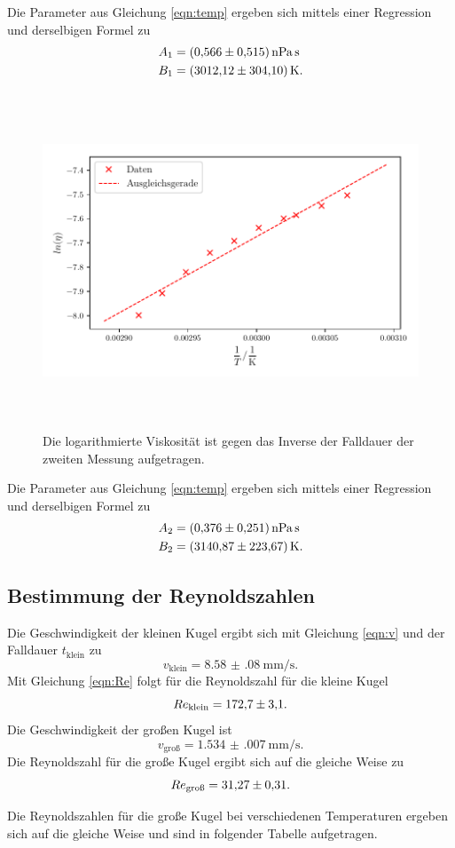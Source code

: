 \noindent Die Parameter aus Gleichung \eqref{eqn:temp} ergeben sich mittels einer Regression und derselbigen Formel zu
\begin{align*} 
    A_1 &= \SI{0.566(515)}{\nano\pascal\second} \\
    B_1 &= \SI{3012.12 \pm 304.10}{\kelvin}. \\
\end{align*}


\begin{figure}
    \centering
    \includegraphics[width=14cm, height=10cm]{build/plot2.pdf}
    \caption{Die logarithmierte Viskosität ist gegen das Inverse
    der Falldauer der zweiten Messung aufgetragen. }
    \label{fig:plot2}
\end{figure}
\noindent Die Parameter aus Gleichung \eqref{eqn:temp} ergeben sich mittels einer Regression und derselbigen Formel zu 
\begin{align*} 
    A_2 &=\SI{0.376(251)}{\nano\pascal\second} \\
    B_2 &=\SI{3140.87 \pm 223.67}{\kelvin}. \\
\end{align*}


\subsection{Bestimmung der Reynoldszahlen}
Die Geschwindigkeit der kleinen Kugel ergibt sich mit Gleichung \eqref{eqn:v}
und der Falldauer $t_\text{klein}$ zu
\begin{equation*}
    v_\text{klein} = \SI{8.58(08)}{\milli\meter\per\second}.
\end{equation*}
Mit Gleichung \eqref{eqn:Re} folgt für die Reynoldszahl für die kleine Kugel
\begin{equation*}
    Re_\text{klein} = \num{172.7 \pm 3.1}.
\end{equation*}
Die Geschwindigkeit der großen Kugel ist
\begin{equation*}
    v_\text{groß} = \SI{1.534(007)}{\milli\meter\per\second}.
\end{equation*}
Die Reynoldszahl für die große Kugel ergibt sich auf die gleiche Weise zu
\begin{equation*}
    Re_\text{groß} = \num{31.27 \pm 0.31}.
\end{equation*}

\noindent Die Reynoldszahlen für die große Kugel bei verschiedenen Temperaturen ergeben sich auf die gleiche Weise und sind in folgender Tabelle aufgetragen. 


